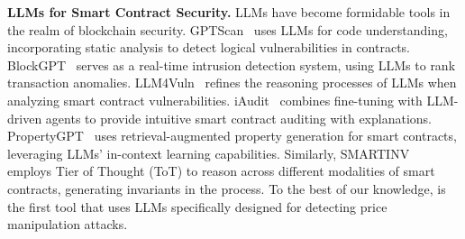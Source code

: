 \noindent
\textbf{LLMs for Smart Contract Security.}
LLMs have become formidable tools in the realm of blockchain security.
GPTScan~\cite{sun2024gptscan} uses LLMs for code understanding, incorporating static analysis to detect logical vulnerabilities in contracts.
BlockGPT~\cite{gai2023blockchain} serves as a real-time intrusion detection system, using LLMs to rank transaction anomalies.
LLM4Vuln~\cite{sun2024llm4vuln} refines the reasoning processes of LLMs when analyzing smart contract vulnerabilities.
iAudit~\cite{ma2024combining} combines fine-tuning with LLM-driven agents to provide intuitive smart contract auditing with explanations.
PropertyGPT~\cite{liu2024propertygpt} uses retrieval-augmented property generation for smart contracts, leveraging LLMs' in-context learning capabilities.
Similarly, SMARTINV~\cite{wang2024smartinv} employs Tier of Thought (ToT) to reason across different modalities of smart contracts, generating invariants in the process.
To the best of our knowledge, \tool is the first tool that uses LLMs specifically designed for detecting price manipulation attacks.
